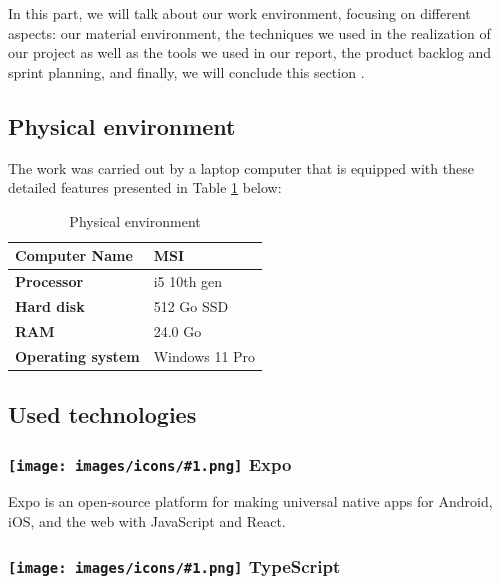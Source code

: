 In this part, we will talk about our work environment, focusing on different aspects:
our material environment, the techniques we used in the realization of our project as well as the tools we used in our report, the product backlog and sprint planning, and finally, we will conclude this section \cite{BeckXP2004, MartinCleanArchitecture2017}.

\subsection{Physical environment}

The work was carried out by a laptop computer that is equipped with these detailed features presented in Table \ref{tab:physical-env} below:
\begin{table}[htbp]
    \centering
    \begin{tabular}{|l|l|}
        \hline
        \textbf{Computer Name} & MSI \\
        \hline
        \textbf{Processor} & i5 10th gen \\
        \hline
        \textbf{Hard disk} & 512 Go SSD \\
        \hline
        \textbf{RAM} & 24.0 Go \\
        \hline
        \textbf{Operating system} & Windows 11 Pro \\
        \hline
    \end{tabular}
    \caption{Physical environment}
    \label{tab:physical-env}
\end{table}


\subsection{Used technologies}

\newcommand{\techicon}[1]{%
  \texttt{[image: images/icons/\#1.png]}%
}

\subsubsection*{\protect\techicon{expo} Expo}

Expo is an open-source platform for making universal native apps for Android, iOS, and the web with JavaScript and React.

\subsubsection*{\protect\techicon{typescript} TypeScript}
                                                                
